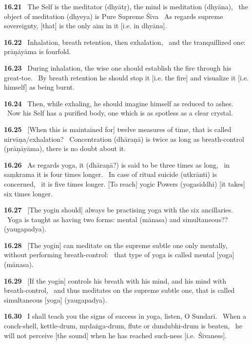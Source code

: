 \documentclass{article}
\begin{document}
\textbf{16.21}%
\ The Self is the meditator (dhyātṛ), the mind is meditation (dhyāna),%
\                         the object of meditation (dhyeya) is Pure Supreme Śiva%
\ As regards supreme sovereignty, [that] is the only aim in it [i.e. in dhyāna].%


\textbf{16.22}%
\ Inhalation, breath retention, then exhalation,%
\                  and the tranquillized one: prāṇāyāma is fourfold.%


\textbf{16.23}%
\ During inhalation, the wise one should establish the fire through his great-toe.%
\                  By breath retention he should stop it [i.e. the fire] and visualize it [i.e. himself] as being burnt.%


\textbf{16.24}%
\ Then, while exhaling, he should imagine himself as reduced to ashes.%
\                  Now his Self has a purified body, one which is as spotless as a clear crystal.%


\textbf{16.25}%
\ [When this is maintained for] twelve measures of time, that is called nirvāṇa/exhalation?%
\                   Concentration (dhāraṇā) is twice as long as breath-control (prāṇāyāma), there is no doubt about it.%


\textbf{16.26}%
\ As regards yoga, it (dhāraṇā?) is said to be three times as long,%
\              in saṃkrama it is four times longer.%
\              In case of ritual suicide (utkrānti) is concerned,%
\              it is five times longer. [To reach] yogic Powers (yogasiddhi) [it takes] six times longer.%


\textbf{16.27}%
\ [The yogin should] always be practising yoga with the six ancillaries.%
\                   Yoga is taught as having two forms: mental (mānasa) and simultaneous?? (yaugapadya).%


\textbf{16.28}%
\ [The yogin] can meditate on the supreme subtle one only mentally, without performing breath-control:%
\                   that type of yoga is called mental [yoga] (mānasa).%


\textbf{16.29}%
\ [If the yogin] controls his breath with his mind, and his mind with breath-control,%
\                 and thus meditates on the supreme subtle one, that is called simultaneous [yoga] (yaugapadya).%


\textbf{16.30}%
\ I shall teach you the signs of success in yoga, listen, O Sundarī.%
\ When a conch-shell, kettle-drum, mṛdaṅga-drum, flute or dundubhi-drum is beaten,%
\                  he will not perceive [the sound] when he has reached such-ness [i.e.\ Śivaness].%
\end{document}
